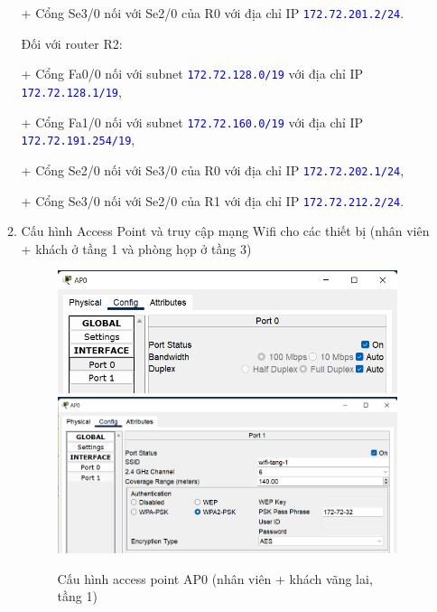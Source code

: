 \begin{enumerate}
\begin{enumerate}
+ Cổng Se3/0 nối với Se2/0 của R0 với địa chỉ IP \texttt{\textcolor{blue}{172.72.201.2/24}}.

Đối với router R2: 

+ Cổng Fa0/0 nối với subnet \texttt{\textcolor{blue}{172.72.128.0/19}} với địa chỉ IP \texttt{\textcolor{blue}{172.72.128.1/19}}, 

+ Cổng Fa1/0 nối với subnet \texttt{\textcolor{blue}{172.72.160.0/19}} với địa chỉ IP \texttt{\textcolor{blue}{172.72.191.254/19}}, 

+ Cổng Se2/0 nối với Se3/0 của R0 với địa chỉ IP \texttt{\textcolor{blue}{172.72.202.1/24}}, 

+ Cổng Se3/0 nối với Se2/0 của R1 với địa chỉ IP \texttt{\textcolor{blue}{172.72.212.2/24}}.

\item Cấu hình Access Point và truy cập mạng Wifi cho các thiết bị (nhân viên + khách ở tầng 1 và phòng họp ở tầng 3)

\begin{figure}[H]
\begin{center}
\includegraphics[scale=.6]{../figures/p2/ap1}
\includegraphics[scale=.6]{../figures/p2/ap2}
\end{center}
\caption{Cấu hình access point AP0 (nhân viên + khách vãng lai, tầng 1)}
\end{figure}


\end{enumerate}
\end{enumerate}
